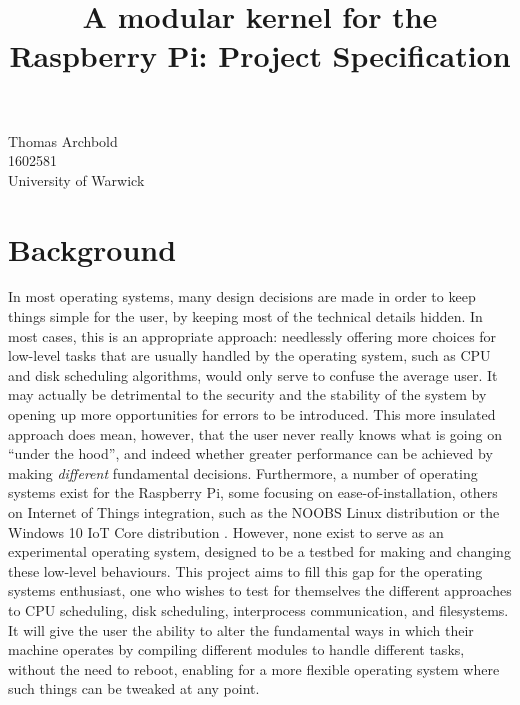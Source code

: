 \documentclass[10pt,a4paper]{article}
\title{A modular kernel for the Raspberry Pi: Project Specification}
\begin{document}
\maketitle

\begin{center}
    Thomas Archbold \\
    1602581 \\
    University of Warwick \\
\end{center}

\section*{Background}
In most operating systems, many design decisions are made in order to keep
things simple for the user, by keeping most of the technical details hidden. In
most cases, this is an appropriate approach: needlessly offering more choices
for low-level tasks that are usually handled by the operating system, such as
CPU and disk scheduling algorithms, would only serve to confuse the average
user. It may actually be detrimental to the security and the stability of the
system by opening up more opportunities for errors to be introduced.  This more
insulated approach does mean, however, that the user never really knows what is
going on ``under the hood'', and indeed whether greater performance can be
achieved by making \textit{different} fundamental decisions.  Furthermore, a
number of operating systems exist for the Raspberry Pi, some focusing on
ease-of-installation, others on Internet of Things integration, such as the
NOOBS \cite{NOOBS} Linux distribution or the Windows 10 IoT Core distribution
\cite{IoT}. However, none exist to serve as an experimental operating system,
designed to be a testbed for making and changing these low-level behaviours.
This project aims to fill this gap for the operating systems enthusiast, one who
wishes to test for themselves the different approaches to CPU scheduling, disk
scheduling, interprocess communication, and filesystems. It will give the user
the ability to alter the fundamental ways in which their machine operates by
compiling different modules to handle different tasks, without the need to
reboot, enabling for a more flexible operating system where such things can be
tweaked at any point.
\end{document}
